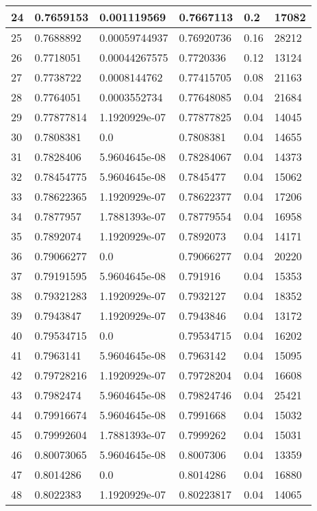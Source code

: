 \begin{longtable}{|l|l|l|l|l|l|}
24 & 0.7659153 & 0.001119569 & 0.7667113 & 0.2 & 17082 \\ \hline 
25 & 0.7688892 & 0.00059744937 & 0.76920736 & 0.16 & 28212 \\ \hline 
26 & 0.7718051 & 0.00044267575 & 0.7720336 & 0.12 & 13124 \\ \hline 
27 & 0.7738722 & 0.0008144762 & 0.77415705 & 0.08 & 21163 \\ \hline 
28 & 0.7764051 & 0.0003552734 & 0.77648085 & 0.04 & 21684 \\ \hline 
29 & 0.77877814 & 1.1920929e-07 & 0.77877825 & 0.04 & 14045 \\ \hline 
30 & 0.7808381 & 0.0 & 0.7808381 & 0.04 & 14655 \\ \hline 
31 & 0.7828406 & 5.9604645e-08 & 0.78284067 & 0.04 & 14373 \\ \hline 
32 & 0.78454775 & 5.9604645e-08 & 0.7845477 & 0.04 & 15062 \\ \hline 
33 & 0.78622365 & 1.1920929e-07 & 0.78622377 & 0.04 & 17206 \\ \hline 
34 & 0.7877957 & 1.7881393e-07 & 0.78779554 & 0.04 & 16958 \\ \hline 
35 & 0.7892074 & 1.1920929e-07 & 0.7892073 & 0.04 & 14171 \\ \hline 
36 & 0.79066277 & 0.0 & 0.79066277 & 0.04 & 20220 \\ \hline 
37 & 0.79191595 & 5.9604645e-08 & 0.791916 & 0.04 & 15353 \\ \hline 
38 & 0.79321283 & 1.1920929e-07 & 0.7932127 & 0.04 & 18352 \\ \hline 
39 & 0.7943847 & 1.1920929e-07 & 0.7943846 & 0.04 & 13172 \\ \hline 
40 & 0.79534715 & 0.0 & 0.79534715 & 0.04 & 16202 \\ \hline 
41 & 0.7963141 & 5.9604645e-08 & 0.7963142 & 0.04 & 15095 \\ \hline 
42 & 0.79728216 & 1.1920929e-07 & 0.79728204 & 0.04 & 16608 \\ \hline 
43 & 0.7982474 & 5.9604645e-08 & 0.79824746 & 0.04 & 25421 \\ \hline 
44 & 0.79916674 & 5.9604645e-08 & 0.7991668 & 0.04 & 15032 \\ \hline 
45 & 0.79992604 & 1.7881393e-07 & 0.7999262 & 0.04 & 15031 \\ \hline 
46 & 0.80073065 & 5.9604645e-08 & 0.8007306 & 0.04 & 13359 \\ \hline 
47 & 0.8014286 & 0.0 & 0.8014286 & 0.04 & 16880 \\ \hline 
48 & 0.8022383 & 1.1920929e-07 & 0.80223817 & 0.04 & 14065 \\ \hline 

\end{longtable}
